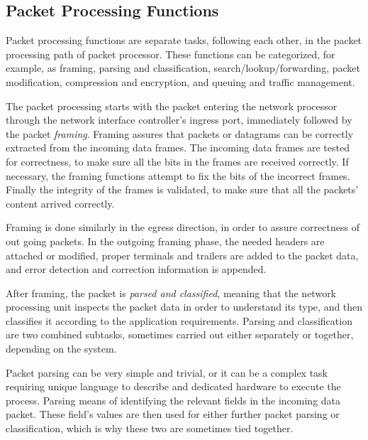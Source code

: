 \subsection{Packet Processing Functions}
Packet processing functions are separate tasks, following each other, in the packet processing path of packet processor. These functions can be categorized, for example, as framing, parsing and classification, search/lookup/forwarding, packet modification, compression and encryption, and queuing and traffic management.~\cite{Giladi:2008:Network}

The packet processing starts with the packet entering the network processor through the network interface controller's ingress port, immediately followed by the packet \emph{framing}. Framing assures that packets or datagrams can be correctly extracted from the incoming data frames. The incoming data frames are tested for correctness, to make sure all the bits in the frames are received correctly. If necessary, the framing functions attempt to fix the bits of the incorrect frames. Finally the integrity of the frames is validated, to make sure that all the packets' content arrived correctly.~\cite{Giladi:2008:Network}

Framing is done similarly in the egress direction, in order to assure correctness of out going packets. In the outgoing framing phase, the needed headers are attached or modified, proper terminals and trailers are added to the packet data, and error detection and correction information is appended.~\cite{Giladi:2008:Network}

After framing, the packet is \emph{parsed and classified}, meaning that the network processing unit inspects the packet data in order to understand its type, and then classifies it according to the application requirements. Parsing and classification are two combined subtasks, sometimes carried out either separately or together, depending on the system.~\cite{Giladi:2008:Network}

Packet parsing can be very simple and trivial, or it can be a complex task requiring unique language to describe and dedicated hardware to execute the process. Parsing means of identifying the relevant fields in the incoming data packet. These field's values are then used for either further packet parsing or classification, which is why these two are sometimes tied together.~\cite{Giladi:2008:Network}

